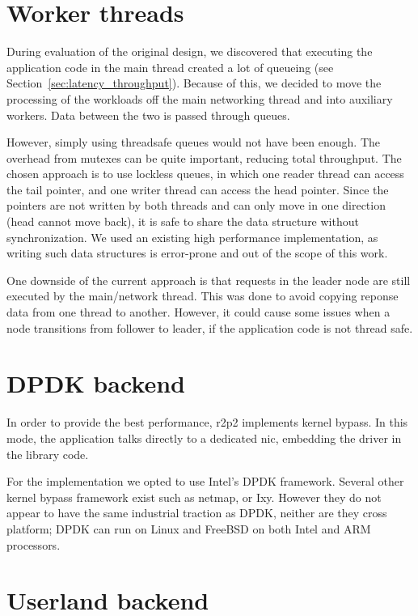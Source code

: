 \section{Worker threads}

During evaluation of the original design, we discovered that executing the application code in the main thread created a lot of queueing (see Section~\ref{sec:latency_throughput}).
Because of this, we decided to move the processing of the workloads off the main networking thread and into auxiliary workers.
Data between the two is passed through queues.

However, simply using threadsafe queues would not have been enough.
The overhead from mutexes can be quite important, reducing total throughput.
The chosen approach is to use lockless queues, in which one reader thread can access the tail pointer, and one writer thread can access the head pointer.
Since the pointers are not written by both threads and can only move in one direction (head cannot move back), it is safe to share the data structure without synchronization.
We used an existing high performance implementation\cite{fast_queue}, as writing such data structures is error-prone and out of the scope of this work.

One downside of the current approach is that requests in the leader node are still executed by the main/network thread.
This was done to avoid copying reponse data from one thread to another.
However, it could cause some issues when a node transitions from follower to leader, if the application code is not thread safe.

\section{DPDK backend}

In order to provide the best performance, \gls{r2p2} implements kernel bypass.
In this mode, the application talks directly to a dedicated \gls{nic}, embedding the driver in the library code.

For the implementation we opted to use Intel's DPDK framework.
Several other kernel bypass framework exist such as netmap\cite{netmap}, or Ixy\cite{ixy}.
However they do not appear to have the same industrial traction as DPDK, neither are they cross platform; DPDK can run on Linux and FreeBSD on both Intel and ARM processors.

\section{Userland backend}


